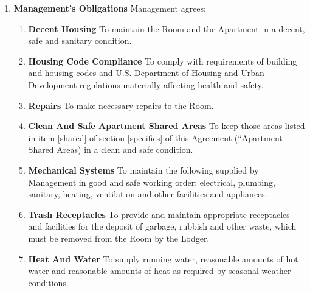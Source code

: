 \documentclass[12pt,letterpaper]{article}
\newcommand{\lodger}{Lodger}
\newcommand{\management}{Management}
\newcommand{\condo}{Wilson Manor}
\newcommand{\apt}{Apartment}
\newcommand{\room}{Room}
\newcommand{\shared}{Apartment Shared Areas}
\begin{document}
\begin{enumerate}
\begin{enumerate}
			\item \textbf{Damage To \room{}, \apt{}, Or \condo{}} \quad No \lodger{}, or guest, or other person under their control shall deface, paint, damage, destroy, tamper with or remove any part of the \room{}, \apt{}, Or \condo{}.
			\item \textbf{Alterations} \quad To make no repairs, alterations or additions of any kind without the prior written consent of \management{}, including but not limited to, painting, changing locks, or installing security bars, doors or safety devices. \management{} may withhold such consent at \management{}'s sole discretion. 
			\item \textbf{Signs} \quad Not to display on or about the \room{}, \apt{}, or \condo{} any signs or advertisements of any kind including, but not limited to, signs for goods or services. 
		\end{enumerate}
	\item \textbf{Management's Obligations} \quad
		\management{} agrees: 
		\begin{enumerate}
			\item \textbf{Decent Housing} \quad To maintain the \room{} and the \apt{} in a decent, safe and sanitary condition. 
			\item \textbf{Housing Code Compliance} \quad To comply with requirements of building and housing codes and U.S. Department of Housing and Urban Development regulations materially affecting health and safety. 
			\item \textbf{Repairs} \quad To make necessary repairs to the \room{}. 
			\item \textbf{Clean And Safe \shared{}} \quad To keep those areas listed in item \ref{shared} of section \ref{specifics} of this Agreement (``\shared{}) in a clean and safe condition. 
			\item \textbf{Mechanical Systems} \quad To maintain the following supplied by \management{} in good and safe working order: electrical, plumbing, sanitary, heating, ventilation and other facilities and appliances. 
			\item \textbf{Trash Receptacles} \quad To provide and maintain appropriate receptacles and facilities for the deposit of garbage, rubbish and other waste, which must be removed from the \room{} by the \lodger{}. 
			\item \textbf{Heat And Water} \quad To supply running water, reasonable amounts of hot water and reasonable amounts of heat as required by seasonal weather conditions. 
		\end{enumerate}

\end{enumerate}
\end{document}
